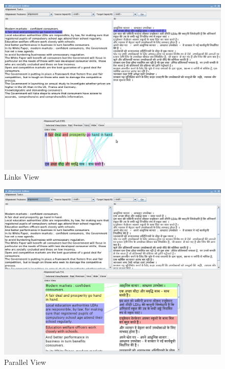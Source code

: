 \begin{figure}[ht]
\begin{center}
\includegraphics[width=\textwidth]{links-view.png}
\caption{Links View}
\label{fig:links-view}
\end{center}
\end{figure}

\begin{figure}[ht]
\begin{center}
\includegraphics[width=\textwidth]{parallel-view.png}
\caption{Parallel View}
\label{fig:parallel-view}
\end{center}
\end{figure}

